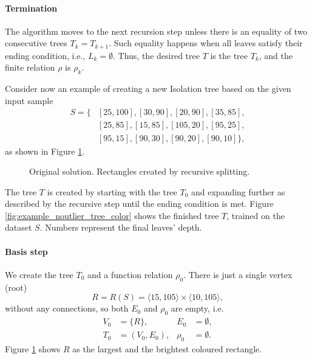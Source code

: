 \paragraph{Termination} The algorithm moves to the next recursion step unless there is an equality of two consecutive trees \(T_k = T_{k+1}\). Such equality happens when all leaves satisfy their ending condition, i.e., \(L_k = \emptyset\).
Thus, the desired tree $T$ is the tree $T_k$, and the finite relation $\rho$ is $\rho_k$.


\begin{example}
\label{example:original_tree_create}
Consider now an example of creating a new Isolation tree based on the given input sample
\begin{align*}
    S = \{&[25,100],[30,90],[20,90],[35,85],\\
    &[25,85],[15,85],[105,20],[95,25], \\
    &[95,15],[90,30],[90,20],[90,10]\},
\end{align*}
as shown in Figure \ref{fig:example_noutlier_gnu}.

\begin{figure}[htbp]
\centering

\caption{Original solution. Rectangles created by recursive splitting.}
\label{fig:example_noutlier_gnu}
\end{figure}



The tree $T$ is created by starting with the tree $T_0$ and expanding further as described by the recursive step until the ending condition is met.
Figure \ref{fig:example_noutlier_tree_color} shows the finished tree $T$, trained on the dataset $S$. Numbers represent the final leaves’ depth.

\paragraph{Basis step} 
We create the tree $T_0$ and a function relation $\rho_0$.
   There is just a single vertex (root) 
   \[R = R(S) = \langle 15, 105 \rangle \times \langle 10, 105 \rangle,\]
   without any connections, so both $E_0$ and $\rho_0$ are empty, i.e.
\begin{align*}
V_0 &= \{R\},& E_0 &= \emptyset,\\
T_0 &= (V_0, E_0),& \rho_0 &= \emptyset.
\end{align*}
Figure \ref{fig:example_noutlier_gnu} shows $R$ as the largest and the brightest coloured rectangle.


\end{example}
